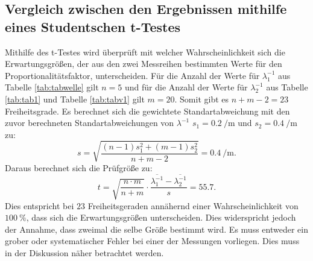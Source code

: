 \subsection{Vergleich zwischen den Ergebnissen mithilfe eines Studentschen t-Testes}
Mithilfe des t-Testes wird überprüft mit welcher Wahrscheinlichkeit sich die Erwartungsgrößen, der aus den zwei Messreihen bestimmten Werte für den Proportionalitätsfaktor, unterscheiden. Für die Anzahl der Werte für $\lambda_1 ^{-1}$ aus Tabelle \ref{tab:tabwelle} gilt $n=5$ und für die Anzahl der Werte für $\lambda_2 ^{-1}$ aus Tabelle \ref{tab:tab1} und Tabelle \ref{tab:tabv1} gilt $m=20$. Somit gibt es $n+m-2=23$ Freiheitsgrade. Es berechnet sich die gewichtete Standartabweichung mit den zuvor berechneten Standartabweichungen von $\lambda ^{-1}$ $s_1 = \SI{0.2}{\per\meter}$ und $s_2 = \SI{0.4}{\per\meter}$ zu:
\begin{displaymath}
	s = \sqrt{\frac{(n-1)s_1^2+(m-1)s_2^2}{n+m-2}} = \SI{0.4}{\per\meter}\text{.}
\end{displaymath}
Daraus berechnet sich die Prüfgröße zu:
\begin{displaymath}
	t = \sqrt{\frac{n \cdot m}{n+m}} \cdot \frac{\overline{\lambda_1^{-1}} -\overline{\lambda_2^{-1}}}{s} = 55.7\text{.}
\end{displaymath}
Dies entspricht bei $23$ Freiheitsgeraden annähernd einer Wahrscheinlichkeit von $\SI{100}{\percent}$, dass sich die Erwartungsgrößen unterscheiden. Dies widerspricht jedoch der Annahme, dass zweimal die selbe Größe bestimmt wird. Es muss entweder ein grober oder systematischer Fehler bei einer der Messungen vorliegen. Dies muss in der Diskussion näher betrachtet werden.



